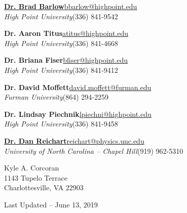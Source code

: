 \documentclass[letterpaper,12pt]{article}
\begin{document}
\vspace{2mm}
\begin{minipage}{6.1in}
\href{http://physics.highpoint.edu/~bbarlow/}{{\large\textbf{Dr. Brad Barlow}}}\hfill \href{mailto:bbarlow@highpoint.edu}{bbarlow@highpoint.edu}\\
\textit{High Point University}\hfill (336) 841-9542

\vspace{3mm}
{\large\textbf{Dr. Aaron Titus}}\hfill \href{mailto:atitus@highpoint.edu}{atitus@highpoint.edu}\\
\textit{High Point University}\hfill (336) 841-4668

\vspace{3mm}
{\large\textbf{Dr. Briana Fiser}}\hfill \href{mailto:bfiser@highpoint.edu}{bfiser@highpoint.edu}\\
\textit{High Point University}\hfill (336) 841-9412

\vspace{3mm}
{\large\textbf{Dr. David Moffett}}\hfill \href{mailto:david.moffett@furman.edu}{david.moffett@furman.edu}\\
\textit{Furman University}\hfill (864) 294-2259

\vspace{3mm}
{\large\textbf{Dr. Lindsay Piechnik}}\hfill \href{mailto:lpiechni@highpoint.edu}{lpiechni@highpoint.edu}\\
\textit{High Point University}\hfill (336) 841-9458

\vspace{3mm}
\href{https://www.danreichart.com/}{{\large\textbf{Dr. Dan Reichart}}}\hfill \href{mailto:reichart@physics.unc.edu}{reichart@physics.unc.edu}\\
\textit{University of North Carolina -- Chapel Hill}\hfill (919) 962-5310
\end{minipage}

\vspace{3mm}
\noindent{}

\vspace{2mm}
\begin{minipage}{6.1in}
Kyle A. Corcoran\\
1143 Tupelo Terrace\\
Charlottesville, VA 22903
\end{minipage}
\vfill
\begin{center}
    {\tiny Last Updated -- June 13, 2019}
\end{center}
\end{document}
